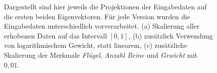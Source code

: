  \begin{figure}
  \qquad
  \qquad
  
  \caption{Dargestellt sind hier jeweils die Projektionen der Eingabedaten auf die ersten beiden Eigenvektoren. Für jede Version wurden die Eingabedaten unterschiedlich vorverarbeitet. (a) Skalierung aller erhobenen Daten auf das Intervall $[0, 1]$, (b) zusätzlich Verwendung von logarithmischem Gewicht, statt linearem, (c) zusätzliche Skalierung der Merkmale \emph{Flügel}, \emph{Anzahl Beine} und \emph{Gewicht} mit $0,01$.}
  \label{projections_scales}
 \end{figure}
 
